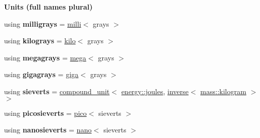 \begin{Indent}{\bf Units (full names plural)}
\begin{DoxyCompactItemize}
\item 
\hypertarget{namespaceunits_1_1radiation_a2016e1022038f81f8465f5a3dc1910f8}{}using {\bfseries milligrays} = \hyperlink{group___unit_manipulators_gaec9d1c320e180eb59f3cb3094d8079dd}{milli}$<$ grays $>$\label{namespaceunits_1_1radiation_a2016e1022038f81f8465f5a3dc1910f8}

\item 
\hypertarget{namespaceunits_1_1radiation_a0b88b59a32a522bc35495873f5358764}{}using {\bfseries kilograys} = \hyperlink{group___unit_manipulators_ga89965a45aaa6689548b9c53858759c5e}{kilo}$<$ grays $>$\label{namespaceunits_1_1radiation_a0b88b59a32a522bc35495873f5358764}

\item 
\hypertarget{namespaceunits_1_1radiation_a02700a5667f1bc0ec2cb8f14324c8819}{}using {\bfseries megagrays} = \hyperlink{group___unit_manipulators_gab1e685fcf4dd9478ed3d688f7af50842}{mega}$<$ grays $>$\label{namespaceunits_1_1radiation_a02700a5667f1bc0ec2cb8f14324c8819}

\item 
\hypertarget{namespaceunits_1_1radiation_a8e01fffe1141fe5cde2b15792335159e}{}using {\bfseries gigagrays} = \hyperlink{group___unit_manipulators_ga4595911f659ef61133216da15d61eb07}{giga}$<$ grays $>$\label{namespaceunits_1_1radiation_a8e01fffe1141fe5cde2b15792335159e}

\item 
\hypertarget{namespaceunits_1_1radiation_a3baa5d6851e1c4da2d345c0103da3824}{}using {\bfseries sieverts} = \hyperlink{group___unit_types_ga9c3f6f077dc894620e1ed8358442a8f1}{compound\+\_\+unit}$<$ \hyperlink{structunits_1_1unit}{energy\+::joules}, \hyperlink{group___unit_manipulators_gaacc539ef162e24b260d023d3ff949b57}{inverse}$<$ \hyperlink{structunits_1_1unit}{mass\+::kilogram} $>$$>$\label{namespaceunits_1_1radiation_a3baa5d6851e1c4da2d345c0103da3824}

\item 
\hypertarget{namespaceunits_1_1radiation_a1c3c1828351d853e1b7d1f9a74440b26}{}using {\bfseries picosieverts} = \hyperlink{group___unit_manipulators_ga82a8d14a3e0877a375a66b64c45baab9}{pico}$<$ sieverts $>$\label{namespaceunits_1_1radiation_a1c3c1828351d853e1b7d1f9a74440b26}

\item 
\hypertarget{namespaceunits_1_1radiation_ad166088185548f8241d8812900ed3e72}{}using {\bfseries nanosieverts} = \hyperlink{group___unit_manipulators_ga1c25c3c1d6c1f3aed3fd1ecf043110d5}{nano}$<$ sieverts $>$\label{namespaceunits_1_1radiation_ad166088185548f8241d8812900ed3e72}


\end{DoxyCompactItemize}
\end{Indent}

